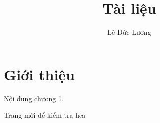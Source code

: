 \documentclass{book}
\begin{document}
\author{Lê Đức Lương}
\title{Tài liệu}
\maketitle

\chapter{Giới thiệu}
Nội dung chương 1.

\newpage
Trang mới để kiểm tra hea
\end{document}
